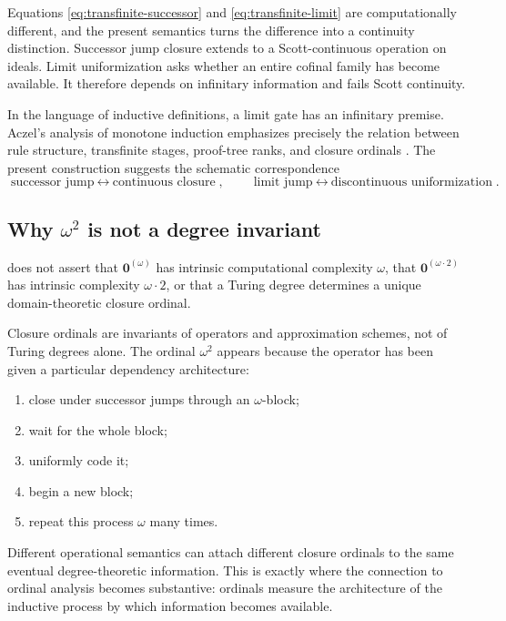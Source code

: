 \documentclass[11pt]{article}
\theoremstyle{definition}
\theoremstyle{remark}
\begin{document}
Equations \eqref{eq:transfinite-successor} and \eqref{eq:transfinite-limit} are computationally different, and the present semantics turns the difference into a continuity distinction. Successor jump closure extends to a Scott-continuous operation on ideals. Limit uniformization asks whether an entire cofinal family has become available. It therefore depends on infinitary information and fails Scott continuity.

In the language of inductive definitions, a limit gate has an infinitary premise. Aczel's analysis of monotone induction emphasizes precisely the relation between rule structure, transfinite stages, proof-tree ranks, and closure ordinals \cite{Aczel1977}. The present construction suggests the schematic correspondence
\[
\boxed{\text{successor jump}\ \leftrightarrow\ \text{continuous closure}},
\qquad
\boxed{\text{limit jump}\ \leftrightarrow\ \text{discontinuous uniformization}}.
\]

\subsection{Why \texorpdfstring{$\omega^2$}{omega squared} is not a degree invariant}

 does not assert that $\mathbf0^{(\omega)}$ has intrinsic computational complexity $\omega$, that $\mathbf0^{(\omega\cdot2)}$ has intrinsic complexity $\omega\cdot2$, or that a Turing degree determines a unique domain-theoretic closure ordinal.

Closure ordinals are invariants of operators and approximation schemes, not of Turing degrees alone. The ordinal $\omega^2$ appears because the operator has been given a particular dependency architecture:
\begin{enumerate}
\item close under successor jumps through an $\omega$-block;
\item wait for the whole block;
\item uniformly code it;
\item begin a new block;
\item repeat this process $\omega$ many times.
\end{enumerate}
Different operational semantics can attach different closure ordinals to the same eventual degree-theoretic information. This is exactly where the connection to ordinal analysis becomes substantive: ordinals measure the architecture of the inductive process by which information becomes available.
\end{document}
